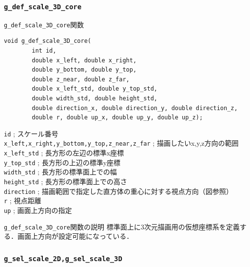 \documentclass[platex,a4paper,12pt]{jsarticle}%
\begin{document}
\clearpage
\subsubsection{\texttt{g\_def\_scale\_3D\_core}}

\begin{itembox}[l]{\texttt{g\_def\_scale\_3D\_core}関数}
\begin{verbatim}
void g_def_scale_3D_core(
        int id,
        double x_left, double x_right,
        double y_bottom, double y_top,
        double z_near, double z_far,
        double x_left_std, double y_top_std,
        double width_std, double height_std,
        double direction_x, double direction_y, double direction_z,
        double r, double up_x, double up_y, double up_z);
\end{verbatim}
\verb|id| ; スケール番号\\
\verb|x_left,x_right,y_bottom,y_top,z_near,z_far| ; 描画したいx,y,z方向の範囲\\
\verb|x_left_std| ; 長方形の左辺の標準x座標\\
\verb|y_top_std| ; 長方形の上辺の標準y座標\\
\verb|width_std| ; 長方形の標準面上での幅\\
\verb|height_std| ; 長方形の標準面上での高さ\\
\verb|direction| ; 描画範囲で指定した直方体の重心に対する視点方向（図参照）\\
\verb|r| ; 視点距離 \\
\verb|up| ; 画面上方向の指定 
\end{itembox}

\begin{itembox}[l]{\texttt{g\_def\_scale\_3D\_core}関数の説明}
標準面上に3次元描画用の仮想座標系を定義する．画面上方向が設定可能になっている．
\end{itembox}




\clearpage
\subsubsection{\texttt{g\_sel\_scale\_2D,g\_sel\_scale\_3D}}
\end{document}
